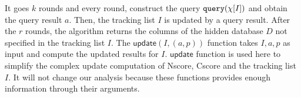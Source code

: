 It goes $k$ rounds and every round, construct the query ${\tt query}(\chi[I])$
and obtain the query result $a$.
Then, the tracking list $I$ is updated by a query result. 
After the $r$ rounds, the algorithm returns the columns of the hidden database $D$ not specified in the tracking list $I$.
The $\mathrel{\mathsf{update}} ( {I}, (a, p))$ function takes $I, a, p$ as input and compute the updated results for $I$.
$\mathsf{update}$ function is used here to simplify the complex update computation of Nscore, Cscore and the tracking list $I$.
It will not change our analysis because these functions provides enough information through their arguments.%

